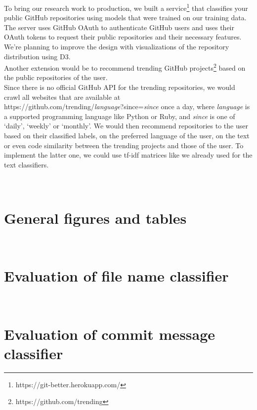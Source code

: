 \documentclass[%
a4paper,
DIV12,
2.5headlines,
bigheadings,
titlepage,
openbib,
]{scrartcl}
\begin{document}
To bring our research work to production, we built a service\footnote{https://git-better.herokuapp.com/} that classifies your public GitHub repositories using models that were trained on our training data.
The server uses GitHub OAuth to authenticate GitHub users and uses their OAuth tokens to request their public repositories and their necessary features.
We're planning to improve the design with visualizations of the repository distribution using D3.\\
Another extension would be to recommend trending GitHub projects\footnote{https://github.com/trending} based on the public repositories of the user.\\
Since there is no official GitHub API for the trending repositories, we would crawl all websites that are available at \\
https://github.com/trending/\textit{language}?since=\textit{since} once a day, where \textit{language} is a supported programming language like Python or Ruby, and \textit{since} is one of `daily', `weekly' or `monthly'.
We would then recommend repositories to the user based on their classified labels, on the preferred language of the user, on the text or even code similarity between the trending projects and those of the user.
To implement the latter one, we could use tf-idf matrices like we already used for the text classifiers.


\newpage
\appendix
\section{\\General figures and tables} \label{App:AppendixA}

\FloatBarrier

\FloatBarrier

\newpage
\section{\\Evaluation of file name classifier} \label{App:AppendixB}

\FloatBarrier

\FloatBarrier

\newpage
\section{\\Evaluation of commit message classifier} \label{App:AppendixC}

\FloatBarrier

\FloatBarrier
\end{document}

